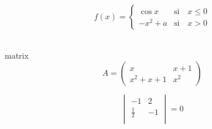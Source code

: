 $$f(x) = 
\begin{cases}
\cos x & \text{si } \text{ } x \leq 0\\
-x^2+a  & \text{si } \text{ } x > 0
\end{cases}
$$

\\matrix
$$A = 
\begin{pmatrix}
x & x+1 \\
x^{2}+x+1 & x^{2}
\end{pmatrix}
$$


$$
\begin{vmatrix} 
-1 & 2\\
\frac{1}{2} & -1\\
\end{vmatrix}=0 
$$

